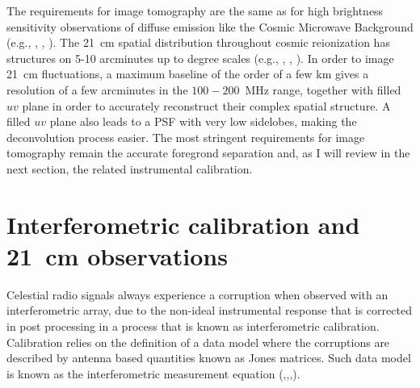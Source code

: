The requirements for image tomography are the same as for high brightness sensitivity observations of diffuse emission like the Cosmic Microwave Background (e.g., \cite{halverson02}, \cite{dickinson04}, \cite{readhead04}). The 21~cm spatial distribution throughout cosmic reionization has structures on 5-10 arcminutes up to degree scales (e.g., \cite{datta12}, \cite{mellema13}, \cite{kakiichi17}). In order to image 21~cm fluctuations, a maximum baseline of the order of a few km gives a resolution of a few arcminutes in the $100-200$~MHz range, together with filled $uv$ plane in order to accurately reconstruct their complex spatial structure. A filled $uv$ plane also leads to a PSF with very low sidelobes, making the deconvolution process easier. The most stringent requirements for image tomography remain the accurate foregrond separation and, as I will review in the next section, the related instrumental calibration.



\section{Interferometric calibration and 21~cm observations}
\label{sec:challenges}

Celestial radio signals always experience a corruption when observed with an interferometric array, due to the non-ideal instrumental response that is corrected in post processing in a process that is known as interferometric calibration. Calibration relies on the definition of a data model where the corruptions are described by antenna based quantities known as Jones matrices. Such data model is known as the interferometric measurement equation (\cite{hamaker96},\cite{smirnov11},\cite{smirnov11b},\cite{smirnov11c}).

